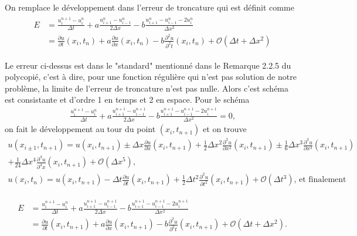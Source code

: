 \documentclass[12pt]{article} %
\newcommand*{\1}{\mathbbm{1}}
\renewcommand*{\O}{\mathcal{O}}
\begin{document}
On remplace le développement dans l'erreur de troncature qui est définit comme
\begin{align*}
\begin{split}
E&=\frac{u_i^{n+1}-u_i^{n}}{\Delta t} + a \frac{u_{i+1}^{n}-u_{i-1}^{n}}{2\Delta x} -b \frac{u_{i+1}^{n}-u_{i-1}^{n} - 2 u_i^{n}}{\Delta x^2} \\
&= \frac{\partial u}{\partial t}(x_i, t_n) + a \frac{\partial u}{\partial x}(x_i, t_n) - b \frac{\partial^2 u}{\partial^2 t}(x_i, t_n) + \O (\Delta t + \Delta x^2)
\end{split}
\end{align*}

Le erreur ci-dessus est dans le "standard" mentionné dans le Remarque 2.2.5 du polycopié, c'est à dire, pour une fonction régulière qui n'est pas solution de notre problème, la limite de l'erreur de troncature n'est pas nulle. Alors c'est schéma est consistante et d'ordre 1 en temps et 2 en espace.
Pour le schéma
\begin{align} \label{eq:sch_imp}
\frac{u_i^{n+1}-u_i^{n}}{\Delta t} + a \frac{u_{i+1}^{n+1}-u_{i-1}^{n+1}}{2\Delta x} -b \frac{u_{i+1}^{n+1}-u_{i-1}^{n+1} - 2 u_i^{n+1}}{\Delta x^2} =0 \text{,}
\end{align}
on fait le développement au tour du point $(x_i, t_{n+1})$ et on trouve
\begin{multline*}
u(x_{i \pm 1}, t_{n+1})= u(x_{i}, t_{n+1}) \pm \Delta x \frac{\partial u}{\partial x} (x_{i}, t_{n+1}) + \frac{1}{2} \Delta x^2 \frac{\partial^2 u}{\partial x^2}(x_{i}, t_{n+1}) \pm \frac{1}{6} \Delta x^3 \frac{\partial^3 u}{\partial x^3}(x_{i}, t_{n+1}) \\ + \frac{1}{24} \Delta x^4 \frac{\partial^4 u}{\partial^4 x} (x_{i}, t_{n+1}) + \O (\Delta x^5) \text{,}
\end{multline*}
\begin{align*}
u(x_{i}, t_{n})=u(x_{i}, t_{n+1}) - \Delta t \frac{\partial u}{\partial t} (x_{i}, t_{n+1}) + \frac{1}{2} \Delta t^2 \frac{\partial^2 u}{\partial t^2} (x_{i}, t_{n+1}) + \O (\Delta t^3) \text{, et finalement}
\end{align*}

\begin{align*}
\begin{split}
E&=\frac{u_i^{n+1}-u_i^{n}}{\Delta t} + a \frac{u_{i+1}^{n+1}-u_{i-1}^{n+1}}{2\Delta x} -b \frac{u_{i+1}^{n+1}-u_{i-1}^{n+1} - 2 u_i^{n+1}}{\Delta x^2} \\
&= \frac{\partial u}{\partial t}(x_i, t_{n+1}) + a \frac{\partial u}{\partial x}(x_i, t_{n+1}) - b \frac{\partial^2 u}{\partial^2 t}(x_i, t_{n+1}) + \O (\Delta t + \Delta x^2) \text{.}
\end{split}
\end{align*}
\end{document}
